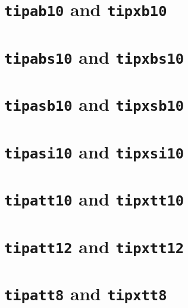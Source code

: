 \sampletext{\small\rmtipa\sffamily\tipaencoding}

\section{\texttt{tipab10} and \texttt{tipxb10}}

\sampletext{\bseries\rmtipa\rmfamily\tipaencoding}

\section{\texttt{tipabs10} and \texttt{tipxbs10}}

\sampletext{\bfseries\slshape\rmtipa\rmfamily\tipaencoding}

\section{\texttt{tipasb10} and \texttt{tipxsb10}}

\sampletext{\bfseries\rmtipa\sffamily\tipaencoding}

\section{\texttt{tipasi10} and \texttt{tipxsi10}}

\sampletext{\slshape\rmtipa\sffamily\tipaencoding}

\section{\texttt{tipatt10} and \texttt{tipxtt10}}

\sampletext{\ttfamily\tipaencoding}

\section{\texttt{tipatt12} and \texttt{tipxtt12}}

\sampletext{\large\ttfamily\tipaencoding}

\section{\texttt{tipatt8} and \texttt{tipxtt8}}

